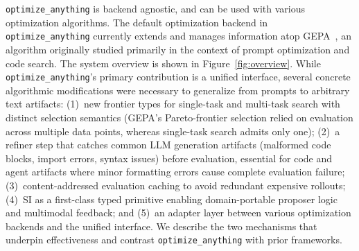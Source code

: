 \documentclass[sigconf]{acmart}
\newcommand{\oa}{\texttt{optimize\_anything}}
\begin{document}
\oa{} is backend agnostic, and can be used with various optimization algorithms. The default optimization backend in \oa{} currently extends and manages information atop GEPA~\cite{agrawal2026gepa}, an algorithm originally studied primarily in the context of prompt optimization and code search.
The system overview is shown in Figure~\ref{fig:overview}. While \oa{}'s primary contribution is a unified interface, several concrete algorithmic modifications were necessary to generalize from prompts to arbitrary text artifacts: (1)~new frontier types for single-task and multi-task search with distinct selection semantics (GEPA's Pareto-frontier selection relied on evaluation across multiple data points, whereas single-task search admits only one); (2)~a refiner step that catches common LLM generation artifacts (malformed code blocks, import errors, syntax issues) before evaluation, essential for code and agent artifacts where minor formatting errors cause complete evaluation failure; (3)~content-addressed evaluation caching to avoid redundant expensive rollouts; (4)~SI as a first-class typed primitive enabling domain-portable proposer logic and multimodal feedback; and (5)~an adapter layer between various optimization backends and the unified interface.
We describe the two mechanisms that underpin effectiveness and contrast \oa{} with prior frameworks.
\end{document}
